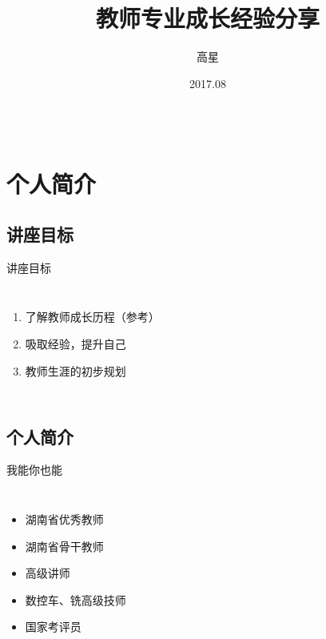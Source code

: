\documentclass[14pt]{beamer}
\title{教师专业成长经验分享}
\author{高星}
\institute{湖南潇湘技师学院~湖南九嶷职院}
\date{2017.08}
\begin{document}
\begin{frame}[plain]
		\maketitle
\end{frame}

\begin{frame}
\begin{columns}
\tableofcontents[hideallsubsections]
\end{columns}
\end{frame}

\section{个人简介}
\subsection{讲座目标}
\begin{frame}{讲座目标}
\begin{columns}
	\begin{enumerate}
	\item 了解教师成长历程（参考）
	\item 吸取经验，提升自己
	\item 教师生涯的初步规划
\end{enumerate}
\end{columns}
\end{frame}

\subsection{个人简介}
\begin{frame}{我能你也能}
\begin{columns}
	\begin{itemize}
		\item 湖南省优秀教师
		\item 湖南省骨干教师
		\item 高级讲师
		\item 数控车、铣高级技师
		\item 国家考评员
	\end{itemize}
\end{columns}
\end{frame}
\end{document}
